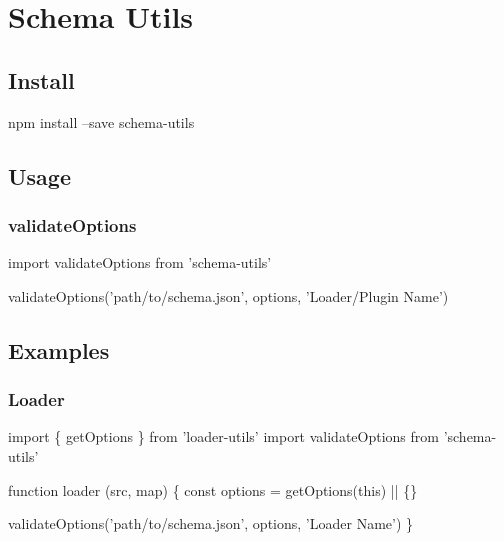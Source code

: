 \href{https://npmjs.com/package/schema-utils}{\tt } \href{https://nodejs.org}{\tt } \href{https://david-dm.org/webpack-contrib/schema-utils}{\tt } \href{https://travis-ci.org/webpack-contrib/schema-utils}{\tt } \href{https://codecov.io/gh/webpack-contrib/schema-utils}{\tt } \href{https://gitter.im/webpack/webpack}{\tt }

 \href{http://json-schema.org}{\tt } \href{https://github.com/webpack/webpack}{\tt } \section*{Schema Utils}

 

\subsection*{Install}


\begin{DoxyCode}
npm install --save schema-utils
\end{DoxyCode}


\subsection*{Usage}

\subsubsection*{{\ttfamily validate\+Options}}


\begin{DoxyCode}
import validateOptions from 'schema-utils'

validateOptions('path/to/schema.json', options, 'Loader/Plugin Name')
\end{DoxyCode}


\subsection*{Examples}

\subsubsection*{Loader}


\begin{DoxyCode}
import \{ getOptions \} from 'loader-utils'
import validateOptions from 'schema-utils'

function loader (src, map) \{
  const options = getOptions(this) || \{\}

  validateOptions('path/to/schema.json', options, 'Loader Name')
\}
\end{DoxyCode}


